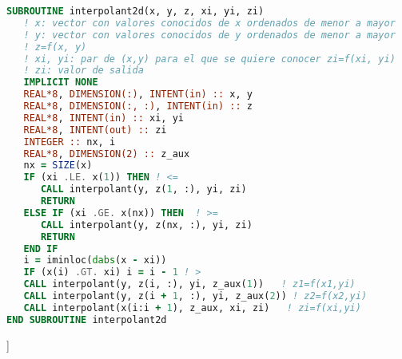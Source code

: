{\small
\begin{lstlisting}[basicstyle=\scriptsize, language=fortran, caption=Interpolación 2D]
SUBROUTINE interpolant2d(x, y, z, xi, yi, zi)
   ! x: vector con valores conocidos de x ordenados de menor a mayor
   ! y: vector con valores conocidos de y ordenados de menor a mayor
   ! z=f(x, y)
   ! xi, yi: par de (x,y) para el que se quiere conocer zi=f(xi, yi)
   ! zi: valor de salida
   IMPLICIT NONE
   REAL*8, DIMENSION(:), INTENT(in) :: x, y
   REAL*8, DIMENSION(:, :), INTENT(in) :: z
   REAL*8, INTENT(in) :: xi, yi
   REAL*8, INTENT(out) :: zi
   INTEGER :: nx, i
   REAL*8, DIMENSION(2) :: z_aux
   nx = SIZE(x)
   IF (xi .LE. x(1)) THEN ! <=
      CALL interpolant(y, z(1, :), yi, zi)
      RETURN
   ELSE IF (xi .GE. x(nx)) THEN  ! >=
      CALL interpolant(y, z(nx, :), yi, zi)
      RETURN
   END IF
   i = iminloc(dabs(x - xi))
   IF (x(i) .GT. xi) i = i - 1 ! >
   CALL interpolant(y, z(i, :), yi, z_aux(1))   ! z1=f(x1,yi)
   CALL interpolant(y, z(i + 1, :), yi, z_aux(2)) ! z2=f(x2,yi)
   CALL interpolant(x(i:i + 1), z_aux, xi, zi)   ! zi=f(xi,yi)
END SUBROUTINE interpolant2d
\end{lstlisting}
]





}
